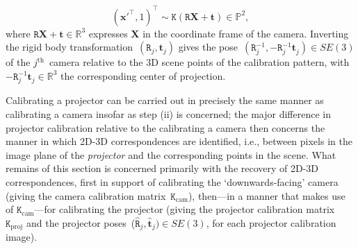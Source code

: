 \documentclass[review]{elsarticle}
\begin{document}
\begin{equation}
(\mathbf{x}'^\top, 1)^\top \sim \mathtt{K}(\mathtt{R}\mathbf{X} + \mathbf{t}) \in \mathbb{P}^2,
\end{equation}
where $\mathtt{R}\mathbf{X} + \mathbf{t} \in \mathbb{R}^3$ expresses $\mathbf{X}$ in the coordinate frame of the camera. Inverting the rigid body transformation~$(\mathtt{R}_j, \mathbf{t}_j)$ gives the pose~$(\mathtt{R}_j^{-1}, -\mathtt{R}_j^{-1}\mathbf{t}_j^{}) \in SE(3)$ of the $j^{\text{th}}$~camera relative to the 3D scene points of the calibration pattern, with $-\mathtt{R}_j^{-1}\mathbf{t}_j^{} \in \mathbb{R}^3$ the corresponding center of projection.

Calibrating a projector \cite{moreno2012simple,zhang2009projector,zhang2006novel} can be carried out in precisely the same manner as calibrating a camera insofar as step (ii) is concerned; the major difference in projector calibration relative to the calibrating a camera then concerns the manner in which 2D-3D correspondences are identified, i.e., between pixels in the image plane of the \textit{projector} and the corresponding points in the scene. What remains of this section is concerned primarily with the recovery of 2D-3D correspondences, first in support of calibrating the `downwards-facing' camera (giving the camera calibration matrix~$\mathtt{K}_\text{cam}$), then---in a manner that makes use of $\mathtt{K}_\text{cam}$---for calibrating the projector (giving the projector calibration matrix~$\mathtt{K}_\text{proj}$ and the projector poses~($\hat{\mathtt{R}}_j, \hat{\mathbf{t}}_j) \in SE(3)$, for each projector calibration image).
\end{document}
